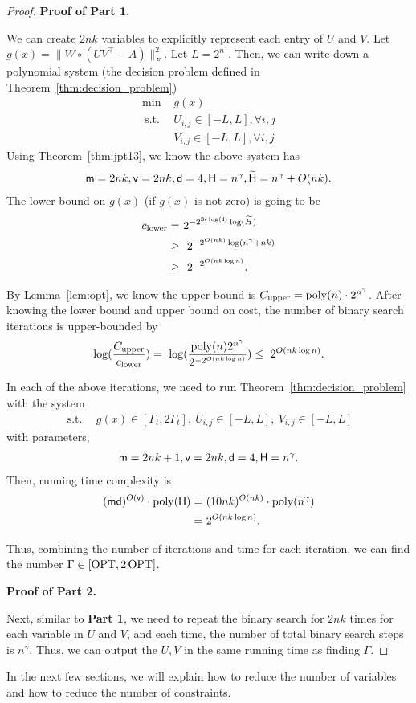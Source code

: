 \begin{proof}

{\bf Proof of Part 1.}

We can create $2nk$ variables to explicitly represent each entry of $U$ and $V$. Let $g(x) =  \| W \circ ( U V^\top - A ) \|_F^2$. Let $L = 2^{n^{\gamma}}$. Then, we can write down a polynomial system (the decision problem defined in Theorem~\ref{thm:decision_problem})
\begin{align*}
   \min & ~  g(x) \\
    \mathrm{~s.t.~} & ~  U_{i,j} \in [-L,L], \forall i,j \\
    & ~ V_{i,j} \in [-L,L], \forall i,j
\end{align*}
Using Theorem~\ref{thm:jpt13}, we know the above system has
\begin{align*}
    \mathsf{m} = 2nk, \mathsf{v} = 2nk, \mathsf{d} = 4, \mathsf{H} = n^{\gamma}, \widetilde{\mathsf{H}} = n^{\gamma} + O(nk).
\end{align*}
The lower bound on $g(x)$ (if $g(x)$ is not zero) is going to be  
\begin{align*}
    c_{\mathrm{lower}} = & ~ 2^{-2^{3\mathsf{v} \log (\mathsf{d})} \log (\widetilde{H}) } \\
    \geq & ~  ~ 2^{-2^{ O( nk )} \log(n^{\gamma} + nk) } \\
    \geq & ~  ~ 2^{-2^{O(nk \log n)}}.
\end{align*}

By Lemma~\ref{lem:opt}, we know the upper bound is $C_{\mathrm{upper}} = \operatorname{poly}(n) \cdot 2^{n^{\gamma}}$.
After knowing the lower bound and upper bound on cost, the number of binary search iterations is upper-bounded by
\begin{align*}
\log( \frac{C_{\mathrm{upper}}}{ c_{\mathrm{lower}} } ) 
= ~ \log( \frac{ \operatorname{poly}(n) 2^{n^{\gamma}} }{ 2^{-2^{ O(nk \log n)} } } ) 
\leq  ~ 2^{O(nk \log n)}.
\end{align*}


In each of the above iterations, we need to run Theorem~\ref{thm:decision_problem} with the system 
\begin{align*}
    \mathrm{~s.t.~} 
    & ~  g(x) \in [\Gamma_t, 2 \Gamma_t] , ~ U_{i,j} \in [-L, L] , ~ V_{i,j} \in [-L, L]
\end{align*}
with parameters,
\begin{align*}
\mathsf{m} = 2nk+1,  \mathsf{v} = 2nk, \mathsf{d} =4, \mathsf{H} = n^{\gamma}.
\end{align*}
Then, running time complexity is
\begin{align*}
 (\mathsf{m} \mathsf{d})^{O(\mathsf{v})} \cdot \operatorname{poly}(\mathsf{H}) 
 =  & ~ (10nk)^{O(nk)} \cdot \operatorname{poly}(n^{\gamma}) \\
 =  & ~ 2^{O( n k \log n) }.
\end{align*}

Thus, combining the number of iterations and time for each iteration, we can find the number $\Gamma \in [\operatorname{OPT}, 2\operatorname{OPT}]$.

{\bf Proof of Part 2.}

Next, similar to {\bf Part 1}, we need to repeat the binary search for $2nk$ times for each variable in $U$ and $V$, and each time, the number of total binary search steps is $n^{\gamma}$. Thus, we can output the $U, V$ in the same running time as finding $\Gamma$.
\end{proof}

In the next few sections, we will explain how to reduce the number of variables and how to reduce the number of constraints.